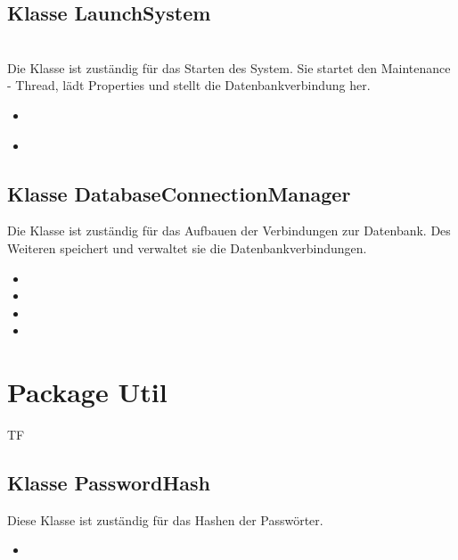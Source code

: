 \documentclass[a4paper]{scrreprt}
\begin{document}
	\subsection{Klasse LaunchSystem}
	\\
	Die Klasse ist zuständig für das Starten des System. Sie startet den Maintenance - Thread, lädt Properties und stellt die Datenbankverbindung her.
	\begin{itemize}
		\item {}\\
		\item {}\\
	\end{itemize}
	
	\subsection{Klasse DatabaseConnectionManager}
	Die Klasse ist zuständig für das Aufbauen der Verbindungen zur Datenbank. Des Weiteren
	speichert und verwaltet sie die Datenbankverbindungen. 
	\begin{itemize}
		\item {}
		\item {}
		\item {}
		\item {}
	\end{itemize}
	
	
	\section{Package Util}
	\begin{tiny}
		TF
	\end{tiny}
	\subsection{Klasse PasswordHash}
	Diese Klasse ist zuständig für das Hashen der Passwörter.
	\begin{itemize}
		\item {}
	\end{itemize}
	
\end{document}

